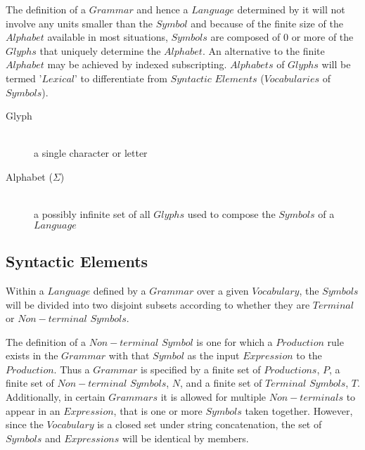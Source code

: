 \documentclass{article}
\begin{document}
The definition of a $Grammar$ and hence a $Language$ determined by it
will not involve any units smaller than the $Symbol$ and because of
the finite size of the $Alphabet$ available in most situations,
$Symbols$ are composed of 0 or more of the $Glyphs$ that uniquely
determine the $Alphabet$. An alternative to the finite $Alphabet$ may
be achieved by indexed subscripting. $Alphabets$ of $Glyphs$ will be
termed '$Lexical$' to differentiate from $Syntactic$ $Elements$
($Vocabularies$ of $Symbols$).

    \begin{description}

    \item[Glyph] \hfill \\
    a single character or letter

    \item[Alphabet ($\Sigma$)] \hfill \\
    a possibly infinite set of all $Glyphs$ used to compose the
    $Symbols$ of a $Language$

    \end{description}

\subsection{Syntactic Elements}

Within a $Language$ defined by a $Grammar$ over a given $Vocabulary$,
the $Symbols$ will be divided into two disjoint subsets according to
whether they are $Terminal$ or $Non-terminal$ $Symbols$.

The definition of a $Non-terminal$ $Symbol$ is one for which a
$Production$ rule exists in the $Grammar$ with that $Symbol$ as the
input $Expression$ to the $Production$. Thus a $Grammar$ is specified
by a finite set of $Productions$, $P$, a finite set of $Non-terminal$
$Symbols$, $N$, and a finite set of $Terminal$ $Symbols$,
$T$. Additionally, in certain $Grammars$ it is allowed for multiple
$Non-terminals$ to appear in an $Expression$, that is one or more
$Symbols$ taken together. However, since the $Vocabulary$ is a closed
set under string concatenation, the set of $Symbols$ and $Expressions$
will be identical by members.
\end{document}
